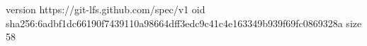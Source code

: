 version https://git-lfs.github.com/spec/v1
oid sha256:6adbf1dc66190f7439110a98664dff3edc9c41c4e163349b939f69fc0869328a
size 58
